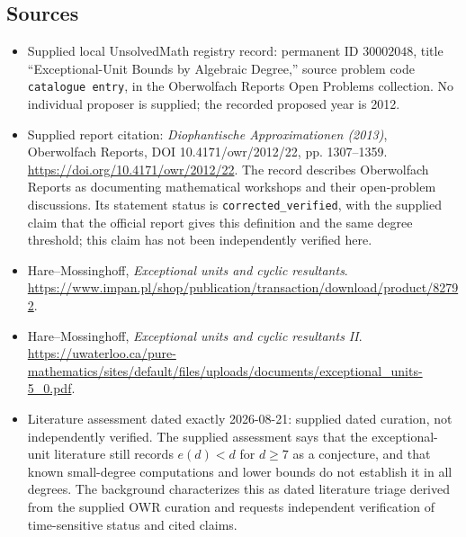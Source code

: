 \documentclass[11pt]{article}
\begin{document}
\subsection{Sources}
\begin{itemize}
\item Supplied local UnsolvedMath registry record: permanent ID \(30002048\), title ``Exceptional-Unit Bounds by Algebraic Degree,'' source problem code \texttt{catalogue entry}, in the Oberwolfach Reports Open Problems collection. No individual proposer is supplied; the recorded proposed year is 2012.
\item Supplied report citation: \emph{Diophantische Approximationen (2013)}, Oberwolfach Reports, DOI 10.4171/owr/2012/22, pp. 1307--1359. \url{https://doi.org/10.4171/owr/2012/22}. The record describes Oberwolfach Reports as documenting mathematical workshops and their open-problem discussions. Its statement status is \texttt{corrected\_verified}, with the supplied claim that the official report gives this definition and the same degree threshold; this claim has not been independently verified here.
\item Hare--Mossinghoff, \emph{Exceptional units and cyclic resultants}. \url{https://www.impan.pl/shop/publication/transaction/download/product/82792}.
\item Hare--Mossinghoff, \emph{Exceptional units and cyclic resultants II}. \url{https://uwaterloo.ca/pure-mathematics/sites/default/files/uploads/documents/exceptional_units-5_0.pdf}.
\item Literature assessment dated exactly 2026-08-21: supplied dated curation, not independently verified. The supplied assessment says that the exceptional-unit literature still records \(e(d)<d\) for \(d\geq 7\) as a conjecture, and that known small-degree computations and lower bounds do not establish it in all degrees. The background characterizes this as dated literature triage derived from the supplied OWR curation and requests independent verification of time-sensitive status and cited claims.
\end{itemize}
\end{document}
